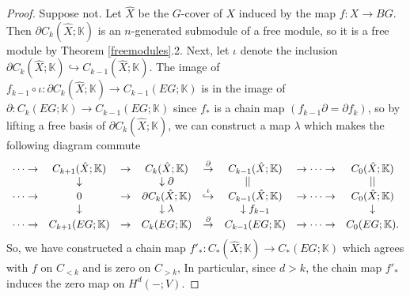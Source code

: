 \documentclass[11pt,letterpaper]{amsart}
\begin{document}
\begin{proof}
Suppose not. Let $\hat X$ be the $G$-cover of $X$ induced by the map $f:X\rightarrow BG$. Then $\partial C_k(\hat X;\mathbb K)$ is an $n$-generated submodule of a free module, so it is a free module by Theorem \ref{freemodules}.2. Next, let $\iota$ denote the inclusion $\partial C_k(\hat X;\mathbb K)\hookrightarrow C_{k-1}(\hat X;\mathbb K)$. The image of $f_{k-1}\circ\iota:\partial C_k(\hat X;\mathbb K)\rightarrow C_{k-1}(EG;\mathbb K)$ is in the image of $\partial:C_k(EG;\mathbb K)\rightarrow C_{k-1}(EG;\mathbb K)$ since $f_*$ is a chain map $(f_{k-1}\partial=\partial f_k)$, so by lifting a free basis of $\partial C_k(\hat X;\mathbb K)$, we can construct a map $\lambda$ which makes the following diagram commute
$$
\begin{array}{cccccccc}
\dots\rightarrow & C_{k+1}(\hat X;\mathbb K)&\rightarrow &C_k(\hat X;\mathbb K)&\stackrel{\partial}\rightarrow &C_{k-1}(\hat X;\mathbb K)&\rightarrow\dots\rightarrow &C_0(\hat X;\mathbb K)\\
&\downarrow&&\downarrow\partial&&||\hspace{0.5cm}&&||\\
\dots\rightarrow & 0&\rightarrow &\partial C_k(\hat X;\mathbb K)&\stackrel{\iota}\hookrightarrow &C_{k-1}(\hat X;\mathbb K)&\rightarrow\dots\rightarrow &C_0(\hat X;\mathbb K)\\
&\downarrow&&\downarrow \lambda&&\downarrow f_{k-1}&&\downarrow\\
\dots\rightarrow & C_{k+1}(EG;\mathbb K)&\rightarrow &C_k(EG;\mathbb K)&\stackrel{\partial}\rightarrow &C_{k-1}(EG;\mathbb K)&\rightarrow\dots\rightarrow &C_0(EG;\mathbb K).
\end{array}
$$
So, we have constructed a chain map $f'_*:C_*(\hat X;\mathbb K)\rightarrow C_*(EG;\mathbb K)$ which agrees with $f$ on $C_{<k}$ and is zero on $C_{>k}$, In particular, since $d>k$, the chain map $f'_*$ induces the zero map on $H^d(-;V)$. %


\end{proof}
\end{document}
